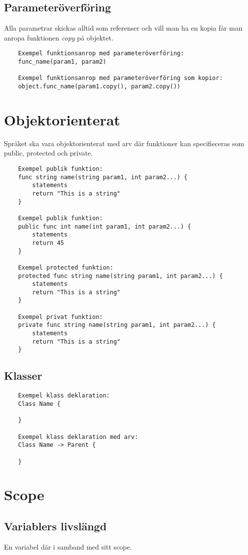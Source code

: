 \documentclass{TDP003mall}
\begin{document}
    \subsection{Parameteröverföring}
    Alla parametrar skickas alltid som referenser och vill man ha en kopia får man anropa funktionen \emph{copy} på objektet.

\begin{verbatim}
    Exempel funktionsanrop med parameteröverföring:
    func_name(param1, param2)

    Exempel funktionsanrop med parameteröverföring som kopior:
    object.func_name(param1.copy(), param2.copy())
\end{verbatim}

    \section{Objektorienterat}
    Språket ska vara objektorienterat med arv där funktioner kan specifieceras som public, protected och private.

    \begin{verbatim}
    Exempel publik funktion:
    func string name(string param1, int param2...) {
        statements
        return "This is a string"
    } 

    Exempel publik funktion: 
    public func int name(int param1, int param2...) { 
        statements
        return 45 
    } 

    Exempel protected funktion: 
    protected func string name(string param1, int param2...) { 
        statements
        return "This is a string"
    } 

    Exempel privat funktion: 
    private func string name(string param1, int param2...) { 
        statements
        return "This is a string"
    } 
\end{verbatim}
    \subsection{Klasser}
        \begin{verbatim}
    Exempel klass deklaration:
    Class Name {
      
    }

    Exempel klass deklaration med arv:
    Class Name -> Parent {
      
    }
\end{verbatim}

    \section{Scope}

    \subsection{Variablers livslängd}
    En variabel där i samband med sitt scope.
 
\end{document}
